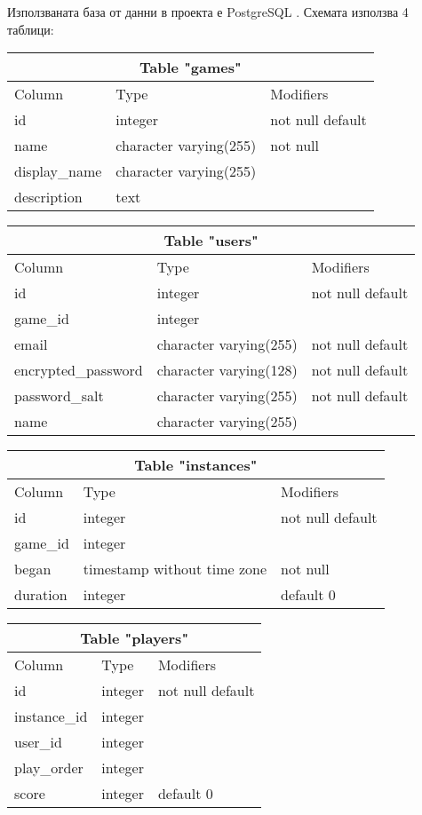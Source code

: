 \documentclass[a4paper]{article}
\begin{document}
Използваната база от данни в проекта е PostgreSQL \cite{postgresql}.
Схемата използва 4 таблици:

\begin{tabular} { | l | l | l | }
\multicolumn{3}{c}{Table "games"} \\
\hline
Column & Type & Modifiers \\
\hline
id & integer & not null default \\
name & character varying(255) & not null \\
display\_name & character varying(255) & \\
description & text & \\
\hline
\end{tabular}

\vspace{10 pt}

\begin{tabular} { | l | l | l | }
\multicolumn{3}{c}{Table "users"} \\
\hline
Column & Type & Modifiers \\
\hline
id & integer & not null default \\
game\_id & integer & \\
email & character varying(255) & not null default \\
encrypted\_password & character varying(128) & not null default \\
password\_salt & character varying(255) & not null default \\
name & character varying(255) & \\ 
\hline
\end{tabular}

\vspace{10 pt}

\begin{tabular} { | l | l | l | }
\multicolumn{3}{c}{Table "instances"} \\
\hline
Column & Type & Modifiers \\
\hline
id & integer & not null default \\
game\_id  & integer                     & \\
began    & timestamp without time zone & not null \\
duration & integer                     & default 0 \\
\hline
\end{tabular}

\begin{tabular} { | l | l | l | }
\multicolumn{3}{c}{Table "players"} \\
\hline
Column & Type & Modifiers \\
\hline
id & integer & not null default \\
instance\_id & integer & \\
user\_id     & integer & \\
play\_order  & integer & \\
score       & integer & default 0 \\
\hline
\end{tabular}
\end{document}

